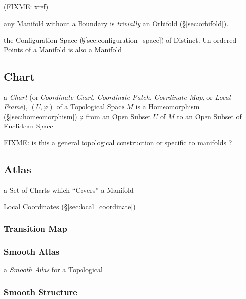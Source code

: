 (FIXME: xref)

\fist any Manifold without a Boundary is \emph{trivially} an Orbifold
(\S\ref{sec:orbifold}).

the Configuration Space (\S\ref{sec:configuration_space}) of Distinct,
Un-ordered Points of a Manifold is also a Manifold



\subsection{Chart}\label{sec:chart}

a \emph{Chart} (or \emph{Coordinate Chart}, \emph{Coordinate Patch},
\emph{Coordinate Map}, or \emph{Local Frame}), $(U, \varphi)$ of a Topological
Space $M$ is a Homeomorphism (\S\ref{sec:homeomorphism}) $\varphi$ from an Open
Subset $U$ of $M$ to an Open Subset of Euclidean Space

FIXME: is this a general topological construction or specific to manifolds ?



\subsection{Atlas}\label{sec:atlas}

a Set of Charts which ``Covers'' a Manifold

\fist Local Coordinates (\S\ref{sec:local_coordinate})



\subsubsection{Transition Map}\label{sec:transition_map}

\subsubsection{Smooth Atlas}\label{sec:smooth_atlas}

a \emph{Smooth Atlas} for a Topological



\subsubsection{Smooth Structure}\label{sec:smooth_structure}

